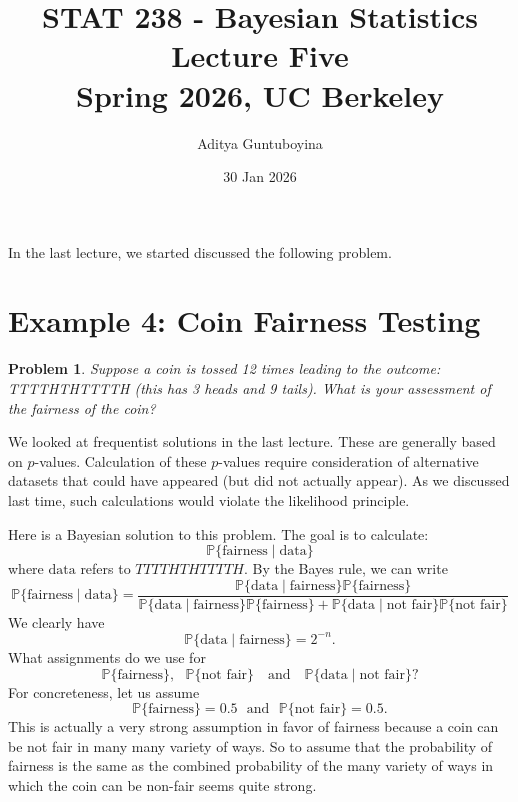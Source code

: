 \documentclass{scrartcl}
\newtheorem{problem}[theorem]{Problem}
\renewcommand{\P}{{\mathbb P}}
\begin{document}
\title{STAT 238 - Bayesian Statistics  \\
  Lecture Five \\
  Spring 2026, UC Berkeley}

\author{Aditya Guntuboyina}


\date{30 Jan 2026}

\maketitle

In the last lecture, we started discussed the following problem.  


\section{Example 4: Coin Fairness Testing}

\begin{problem}
Suppose a coin is tossed 12 times leading to the outcome: TTTTHTHTTTTH
(this has 3 heads and 9 tails). What is your assessment of the
fairness of the coin?  
\end{problem}

We looked at frequentist solutions in the last lecture. These are
generally based on $p$-values. Calculation of these $p$-values require
consideration of alternative datasets that could have appeared (but
did not actually appear). As we discussed last time, such calculations
would violate the likelihood principle.

Here is a Bayesian solution to this problem. The goal is to calculate: 
\begin{equation*}
  \P\{\text{fairness} \mid \text{data}\}
\end{equation*}
where $\text{data}$ refers to $TTTTHTHTTTTH$. By the Bayes rule, we
can write
\begin{equation*}
  \P\{\text{fairness} \mid \text{data}\} = \frac{\P\{\text{data} \mid
    \text{fairness}\} \P\{\text{fairness}\}}{\P\{\text{data} \mid
    \text{fairness}\} \P\{\text{fairness}\} + \P\{\text{data} \mid
    \text{not fair}\} \P\{\text{not fair}\}}
\end{equation*}
We clearly have
\begin{equation*}
  \P\{\text{data} \mid \text{fairness}\}= 2^{-n}. 
\end{equation*}
What assignments do we use for
\begin{equation*}
  \P\{\text{fairness}\}, ~~~ \P\{\text{not fair}\} ~~~ \text{ and }
  ~~~ \P\{\text{data} \mid \text{not fair}\}?
\end{equation*}
For concreteness, let us assume
\begin{equation}\label{prior_fair}
  \P\{\text{fairness}\} = 0.5 ~~~ \text{and} ~~~ \P\{\text{not fair}\}
  = 0.5. 
\end{equation}
This is actually a very strong assumption in favor of fairness
because a coin can be not fair in many many variety of ways. So to
assume that the probability of fairness is the same as the combined
probability of the many variety of ways in which the coin can be
non-fair seems quite strong. 
\end{document}
